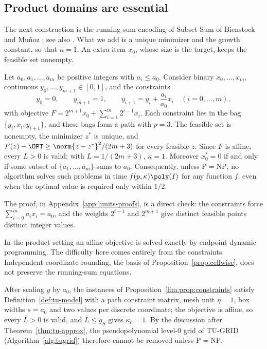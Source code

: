 \subsection{Product domains are essential}\label{sec:limits-constraints}

The next construction is the running-sum encoding of Subset Sum of Bienstock
and Mu\~noz \cite[Appendix~A]{BienstockMunoz2018}; see also
\cite[Example~1.1]{CifuentesParrilo2016}. What we add is a unique minimizer
and the growth constant, so that $\kappa=1$. An extra item $x_0$, whose size
is the target, keeps the feasible set nonempty.

\begin{proposition}\label{lim:prop:constraints}
Let $a_0,a_1,\ldots,a_m$ be positive integers with $a_i\le a_0$. Consider
binary $x_0,\ldots,x_m$, continuous $y_0,\ldots,y_{m+1}\in[0,1]$, and the
constraints
\[
y_0=0,\qquad y_{m+1}=1,\qquad y_{i+1}=y_i+\frac{a_i}{a_0}x_i\quad(i=0,\ldots,m),
\]
with objective $F=2^{m+1}x_0+\sum_{i=1}^m2^{i-1}x_i$. Each constraint lies in
the bag $\{y_i,x_i,y_{i+1}\}$, and these bags form a path with $p=3$. The
feasible set is nonempty, the minimizer $z^*$ is unique, and
$F(z)-\OPT\ge\norm{z-z^*}^2/(2m+3)$ for every feasible $z$. Since $F$ is
affine, every $L>0$ is valid; with $L=1/(2m+3)$, $\kappa=1$. Moreover
$x_0^*=0$ if and only if some subset of $\{a_1,\ldots,a_m\}$ sums to $a_0$.
Consequently, unless $\mathrm P=\mathrm{NP}$, no algorithm solves such
problems in time $f(p,\kappa)\poly(I)$ for any function $f$, even when the
optimal value is required only within $1/2$.
\end{proposition}

The proof, in Appendix~\ref{app:limits-proofs}, is a direct check: the
constraints force $\sum_{i=0}^ma_ix_i=a_0$, and the weights $2^{i-1}$ and
$2^{m+1}$ give distinct feasible points distinct integer values.

In the product setting an affine objective is solved exactly by endpoint
dynamic programming. The difficulty here comes entirely from the
constraints. Independent coordinate rounding, the basis of
Proposition~\ref{prop:cellwise}, does not preserve the running-sum equations.

After scaling $y$ by $a_0$, the instances of
Proposition~\ref{lim:prop:constraints} satisfy Definition~\ref{def:tu-model}
with a path constraint matrix, mesh unit $\eta=1$, box widths $s=a_0$ and two
values per discrete coordinate; the objective is affine, so every $\bar L>0$
is valid, and $\bar L\le g_S$ gives $\kappa_c=1$. By the discussion after
Theorem~\ref{thm:tu-approx}, the pseudopolynomial level-$0$ grid of
TU-GRID (Algorithm~\ref{alg:tugrid}) therefore cannot be removed unless
P${}={}$NP.

